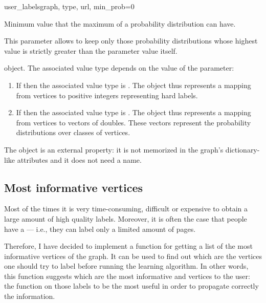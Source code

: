 \begin{independentfunctiondoc}{user\_labels}{graph, type, url, min\_prob=0}
\begin{functionparameters}
                    Minimum value that the maximum of a probability distribution can have.
                    
                    This parameter allows to keep only those probability distributions whose highest value is strictly greater than the parameter value itself.
                \end{functionparameters}
                
                \begin{functionoutput}
                     object. The associated value type depends on the value of the  \normalfont parameter:
                    \begin{enumerate}
                        \item If  then the associated value type is .  The object thus represents a mapping from vertices to positive integers representing hard labels.
                        \item If  then the associated value type is . The object thus represents a mapping from vertices to vectors of doubles. These vectors represent the probability distributions over classes of vertices.
                    \end{enumerate}
                    
                    The object is an external property: it is not memorized in the graph's dictionary-like attributes and it does not need a name.
                \end{functionoutput}
            \end{independentfunctiondoc}
        \subsection{Most informative vertices}
            Most of the times it is very time-consuming, difficult or expensive to obtain a large amount of high quality labels. Moreover, it is often the case that people have a  --- i.e., they can label only a limited amount of pages.
            
            Therefore, I have decided to implement a function for getting a list of the most informative vertices of the graph. It can be used to find out which are the vertices one should try to label before running the learning algorithm. In other words, this function suggests which are the most informative and  vertices to the user: the function  on those labels to be the most useful in order to propagate correctly the information.
            
